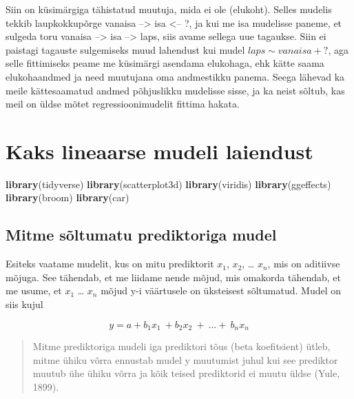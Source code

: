 \documentclass[]{book}
\newenvironment{Shaded}{\begin{snugshade}}{\end{snugshade}}
\newcommand{\KeywordTok}[1]{\textcolor[rgb]{0.13,0.29,0.53}{\textbf{#1}}}
\newcommand{\NormalTok}[1]{#1}
\begin{document}
Siin on küsimärgiga tähistatud muutuja, mida ei ole (elukoht). Selles mudelis tekkib laupkokkupõrge vanaisa --\textgreater{} isa \textless{}-- ?, ja kui me isa mudelisse paneme, et sulgeda toru vanaisa --\textgreater{} isa --\textgreater{} laps, siis avame sellega uue tagaukse. Siin ei paistagi tagauste sulgemiseks muud lahendust kui mudel \(laps \sim vanaisa + ?\), aga selle fittimiseks peame me küsimärgi asendama elukohaga, ehk kätte saama elukohaandmed ja need muutujana oma andmestikku panema. Seega lähevad ka meile kättesaamatud andmed põhjuslikku mudelisse sisse, ja ka neist sõltub, kas meil on üldse mõtet regressioonimudelit fittima hakata.

\hypertarget{kaks-lineaarse-mudeli-laiendust}{%
\chapter{Kaks lineaarse mudeli laiendust}\label{kaks-lineaarse-mudeli-laiendust}}

\begin{Shaded}
\begin{Highlighting}[]
\KeywordTok{library}\NormalTok{(tidyverse)}
\KeywordTok{library}\NormalTok{(scatterplot3d)}
\KeywordTok{library}\NormalTok{(viridis)}
\KeywordTok{library}\NormalTok{(ggeffects)}
\KeywordTok{library}\NormalTok{(broom)}
\KeywordTok{library}\NormalTok{(car)}
\end{Highlighting}
\end{Shaded}

\hypertarget{mitme-soltumatu-prediktoriga-mudel}{%
\section{Mitme sõltumatu prediktoriga mudel}\label{mitme-soltumatu-prediktoriga-mudel}}

Esiteks vaatame mudelit, kus on mitu prediktorit \(x_1\), \(x_2\), \ldots{} \(x_n\), mis on aditiivse mõjuga.
See tähendab, et me liidame nende mõjud, mis omakorda tähendab, et me usume, et \(x_1\) \ldots{} \(x_n\) mõjud y-i väärtusele on üksteisest sõltumatud.
Mudel on siis kujul

\[y = a + b_1x_1~ + b_2x_2~ +~ ... +~ b_nx_n\]

\begin{quote}
Mitme prediktoriga mudeli iga prediktori tõus (beta koefitsient) ütleb, mitme ühiku võrra ennustab mudel y muutumist juhul kui see prediktor muutub ühe ühiku võrra ja kõik teised prediktorid ei muutu üldse (Yule, 1899).
\end{quote}
\end{document}
